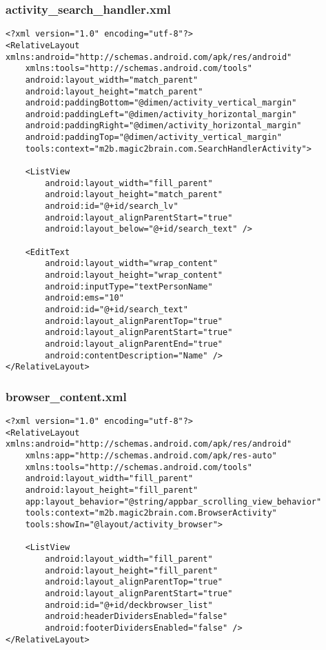 \subsubsection*{activity\_search\_handler.xml}
\begin{lstlisting}
<?xml version="1.0" encoding="utf-8"?>
<RelativeLayout xmlns:android="http://schemas.android.com/apk/res/android"
    xmlns:tools="http://schemas.android.com/tools"
    android:layout_width="match_parent"
    android:layout_height="match_parent"
    android:paddingBottom="@dimen/activity_vertical_margin"
    android:paddingLeft="@dimen/activity_horizontal_margin"
    android:paddingRight="@dimen/activity_horizontal_margin"
    android:paddingTop="@dimen/activity_vertical_margin"
    tools:context="m2b.magic2brain.com.SearchHandlerActivity">

    <ListView
        android:layout_width="fill_parent"
        android:layout_height="match_parent"
        android:id="@+id/search_lv"
        android:layout_alignParentStart="true"
        android:layout_below="@+id/search_text" />

    <EditText
        android:layout_width="wrap_content"
        android:layout_height="wrap_content"
        android:inputType="textPersonName"
        android:ems="10"
        android:id="@+id/search_text"
        android:layout_alignParentTop="true"
        android:layout_alignParentStart="true"
        android:layout_alignParentEnd="true"
        android:contentDescription="Name" />
</RelativeLayout>
\end{lstlisting}

\subsubsection*{browser\_content.xml}
\begin{lstlisting}
<?xml version="1.0" encoding="utf-8"?>
<RelativeLayout xmlns:android="http://schemas.android.com/apk/res/android"
    xmlns:app="http://schemas.android.com/apk/res-auto"
    xmlns:tools="http://schemas.android.com/tools"
    android:layout_width="fill_parent"
    android:layout_height="fill_parent"
    app:layout_behavior="@string/appbar_scrolling_view_behavior"
    tools:context="m2b.magic2brain.com.BrowserActivity"
    tools:showIn="@layout/activity_browser">

    <ListView
        android:layout_width="fill_parent"
        android:layout_height="fill_parent"
        android:layout_alignParentTop="true"
        android:layout_alignParentStart="true"
        android:id="@+id/deckbrowser_list"
        android:headerDividersEnabled="false"
        android:footerDividersEnabled="false" />
</RelativeLayout>
\end{lstlisting}

